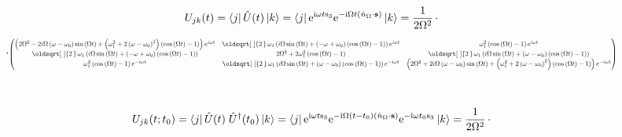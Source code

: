 \documentclass[10pt,a4paper]{article}
\renewcommand*{\sqrt}[2][\ ]{\oldsqrt[#1]{#2\,}\,}
\newcommand{\const}[1]{\text{#1}}
\newcommand{\mat}[1]{
    \begin{pmatrix}
        #1
    \end{pmatrix}
}
\newcommand{\bra}[1]{\left< #1 \right|}
\newcommand{\ket}[1]{\left| #1 \right>}
\newcommand{\e}[1]{\const{e}^{#1}}
\renewcommand{\i}{\const{i}}
\begin{document}
\begin{gather*}
    \\
    \\
    \\
    U_{jk}(t) =
    \bra{j} \hat{U}(t) \ket{k} =
    \bra{j}
    \e{\i\omega t \const{s}_3}
    \e{-\i\Omega t \left(\hat{n}_\Omega \cdot \mathbf{s}\right)}
    \ket{k} =
    \frac{1}{2 \Omega^2} \,\cdot \\[5pt]
    \cdot \scalebox{0.6}{$\mat{\left(2 \Omega^{2} - 2 i \Omega \left(\omega - \omega_{0}\right) \sin{\left(\Omega t \right)} + \left(\omega_{1}^{2} + 2 \left(\omega - \omega_{0}\right)^{2}\right) \left(\cos{\left(\Omega t \right)} - 1\right)\right) e^{i \omega t} & \sqrt{2} \omega_{1} \left(i \Omega \sin{\left(\Omega t \right)} + \left(- \omega + \omega_{0}\right) \left(\cos{\left(\Omega t \right)} - 1\right)\right) e^{i \omega t} & \omega_{1}^{2} \left(\cos{\left(\Omega t \right)} - 1\right) e^{i \omega t}\\\sqrt{2} \omega_{1} \left(i \Omega \sin{\left(\Omega t \right)} + \left(- \omega + \omega_{0}\right) \left(\cos{\left(\Omega t \right)} - 1\right)\right) & 2 \Omega^{2} + 2 \omega_{1}^{2} \left(\cos{\left(\Omega t \right)} - 1\right) & \sqrt{2} \omega_{1} \left(i \Omega \sin{\left(\Omega t \right)} + \left(\omega - \omega_{0}\right) \left(\cos{\left(\Omega t \right)} - 1\right)\right)\\\omega_{1}^{2} \left(\cos{\left(\Omega t \right)} - 1\right) e^{- i \omega t} & \sqrt{2} \omega_{1} \left(i \Omega \sin{\left(\Omega t \right)} + \left(\omega - \omega_{0}\right) \left(\cos{\left(\Omega t \right)} - 1\right)\right) e^{- i \omega t} & \left(2 \Omega^{2} + 2 i \Omega \left(\omega - \omega_{0}\right) \sin{\left(\Omega t \right)} + \left(\omega_{1}^{2} + 2 \left(\omega - \omega_{0}\right)^{2}\right) \left(\cos{\left(\Omega t \right)} - 1\right)\right) e^{- i \omega t}}$}
    \\
    \\
    \\
    U_{jk}(t;t_0) =
    \bra{j} \hat{U}(t) \; \hat{U}^\dagger(t_0) \ket{k} =
    \bra{j}
    \e{\i\omega t \const{s}_3}
    \e{-\i\Omega (t-t_0) \left(\hat{n}_\Omega \cdot \mathbf{s}\right)}
    \e{-\i\omega t_0 \const{s}_3}
    \ket{k} =
    \frac{1}{2 \Omega^2} \,\cdot \\[5pt]
    \hspace{-2em}

\end{gather*}
\end{document}
